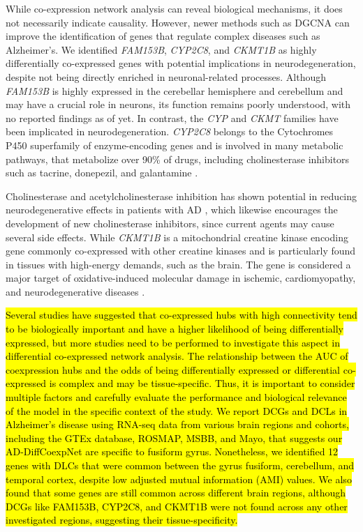 \documentclass[utf8]{FrontiersinHarvard} %
\begin{document}
While co-expression network analysis can reveal biological mechanisms, it does not necessarily indicate causality. However, newer methods such as DGCNA can improve the identification of genes that regulate complex diseases such as Alzheimer's. We identified \textit{FAM153B}, \textit{CYP2C8}, and \textit{CKMT1B} as highly differentially co-expressed genes with potential implications in neurodegeneration, despite not being directly enriched in neuronal-related processes. Although \textit{FAM153B} is highly expressed in the cerebellar hemisphere and cerebellum and may have a crucial role in neurons, its function remains poorly understood, with no reported findings as of yet. In contrast, the \textit{CYP} and \textit{CKMT} families have been implicated in neurodegeneration. \textit{CYP2C8} belongs to the Cytochromes P450 superfamily of enzyme-encoding genes and is involved in many metabolic pathways, that metabolize over 90\% of drugs, including cholinesterase inhibitors such as tacrine, donepezil, and galantamine \citep{cacabelos2007pharmacogenetic}.

Cholinesterase and acetylcholinesterase inhibition has shown potential in reducing neurodegenerative effects in patients with AD \citep{sharma2019cholinesterase}, which likewise encourages the development of new cholinesterase inhibitors, since current agents may cause several side effects. While \textit{CKMT1B} is a mitochondrial creatine kinase encoding gene commonly co-expressed with other creatine kinases and is particularly found in tissues with high-energy demands, such as the brain. The gene is considered a major target of oxidative-induced molecular damage in ischemic, cardiomyopathy, and neurodegenerative diseases \citep{shi2021ckmt1b}. 

\hl{Several studies have suggested that co-expressed hubs with high connectivity tend to be biologically important and have a higher likelihood of being differentially expressed, but more studies need to be performed to investigate this aspect in differential co-expressed network analysis. The relationship between the AUC of coexpression hubs and the odds of being differentially expressed or differential co-expressed is complex and may be tissue-specific. Thus, it is important to consider multiple factors and carefully evaluate the performance and biological relevance of the model in the specific context of the study. We report DCGs and DCLs in Alzheimer's disease using RNA-seq data from various brain regions and cohorts, including the GTEx database, ROSMAP, MSBB, and Mayo, that suggests our AD-DiffCoexpNet are specific to fusiform gyrus. Nonetheless, we identified 12 genes with DLCs that were common between the gyrus fusiform, cerebellum, and temporal cortex, despite low adjusted mutual information (AMI) values. We also found that some genes are still common across different brain regions, although DCGs like FAM153B, CYP2C8, and CKMT1B were not found across any other investigated regions, suggesting their tissue-specificity.}
\end{document}

